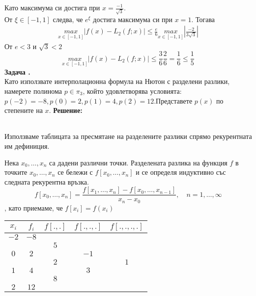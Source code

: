 \documentclass[12pt]{article}
\newcounter{problem}
\newcounter{solution}
\newcommand\problem{%
  \stepcounter{problem}%
  \textbf{Задача \theproblem.}~%
  \\
}
\newcommand\solution{%
  \textbf{Решение:}\\~%
}
\begin{document}
        Като максимума си достига при $x=\frac{-1}{\sqrt3}$.\\
        От $\xi\in[-1,1]$ следва, че $e^\xi$ достига максимума си при $x=1$.
        Тогава
        \begin{align*}
        \underset{x\in[-1,1]}{max}|f(x)-L_2(f;x)| \leq \frac{e}{6}\underset{x\in[-1,1]}{max}\left |\frac{-2}{3\sqrt3}\right|
        \end{align*}
        От $e < 3$ и $\sqrt3 < 2$
        \begin{equation*}
        \underset{x\in[-1,1]}{max}|f(x)-L_2(f;x)| \leq\frac{3}{6}\frac{2}{6}=\frac{1}{6} \leq \frac{1}{5} 
        \end{equation*}
    \problem
        Като използвате интерполационна формула на Нютон с разделени разлики, намерете полинома $p\in\pi_3$, който удовлетворява условията: $p(-2) = -8, p(0) = 2, p(1)=4, p(2) = 12$.Представете $p(x)$ по степените на $x$.
    \solution
        Използваме таблицата за пресмятане на разделените разлики спрямо рекурентната им дефиниция.\\
        \begin{tcolorbox}[colback=red!5!white,colframe=red!75!black]
            Нека $x_0, \dotso, x_n$ са дадени различни точки. Разделената разлика на функция $f$ в точките $x_0, \dotso, x_n$ се бележи с $f[x_0, \dotso, x_n]$ и се определя индуктивно със следната рекурентна връзка.
            \begin{equation*}
              f[x_0, \dotso, x_n] = \frac{f[x_1, \dotso, x_n] - f[x_0, \dotso, x_{n-1}]}{x_n - x_0},\hspace{12pt}n = 1, \dotso, \infty
            \end{equation*}
            , като приемаме, че $f[x_i] = f(x_i)$
        \end{tcolorbox}
        \begin{tabular}{|c c c c c|}
        \hline
        $x_i$&$f_i$&$f[.,.]$&$f[.,.,.]$&$f[.,.,.,.]$\\
        \hline
        $-2$ & $-8$ &     &      &\\
             &      & $5$ &      &\\
        $0$  & $2$  &     & $-1$ &\\
             &      & $2$ &      &$1$\\
        $1$  & $4$  &     & $3$  &\\
             &      & $8$ &      &\\
        $2$  & $12$ &     &      &\\
        \hline
        \end{tabular}\\
\end{document}
